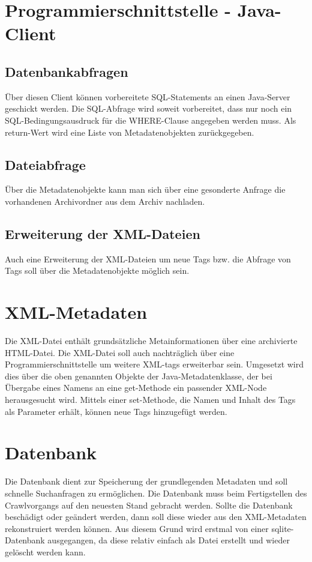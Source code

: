 \section{Programmierschnittstelle - Java-Client}
\subsection{Datenbankabfragen}
	Über diesen Client können vorbereitete SQL-Statements an einen Java-Server geschickt werden. 
	Die SQL-Abfrage wird soweit vorbereitet, dass nur noch ein SQL-Bedingungsausdruck für die WHERE-Clause angegeben werden muss.
	Als return-Wert wird eine Liste von Metadatenobjekten zurückgegeben.
\subsection{Dateiabfrage}
	Über die Metadatenobjekte kann man sich über eine gesonderte Anfrage die vorhandenen Archivordner aus dem Archiv nachladen.
\subsection{Erweiterung	der XML-Dateien}
Auch eine Erweiterung der XML-Dateien um neue Tags bzw. die Abfrage von Tags soll über die 
Metadatenobjekte möglich sein.

\section{XML-Metadaten}
Die XML-Datei enthält grundsätzliche Metainformationen über eine archivierte HTML-Datei.
Die XML-Datei soll auch nachträglich über eine Programmierschnittstelle um weitere XML-tags erweiterbar sein.
Umgesetzt wird dies über die oben genannten Objekte der Java-Metadatenklasse, 
der bei Übergabe eines Namens an eine get-Methode ein passender XML-Node herausgesucht wird.
Mittels einer set-Methode, die Namen und Inhalt des Tags als Parameter erhält, können neue Tags hinzugefügt werden. 

\section{Datenbank}
Die Datenbank dient zur Speicherung der grundlegenden Metadaten und soll schnelle Suchanfragen zu ermöglichen.
Die Datenbank muss beim Fertigstellen des Crawlvorgangs auf den neuesten Stand gebracht werden.
Sollte die Datenbank beschädigt oder geändert werden, dann soll diese wieder aus den
XML-Metadaten rekonstruiert werden können.
Aus diesem Grund wird erstmal von einer sqlite-Datenbank ausgegangen, 
da diese relativ einfach als Datei erstellt und wieder gelöscht werden kann. 

